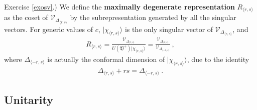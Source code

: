 \documentclass[12pt,a4paper,notitlepage]{report}
\numberwithin{equation}{section}
\theoremstyle{break}
\begin{document}
Exercise \ref{exosv}.) We define the \textbf{\boldmath maximally degenerate representation} $R_{\langle r,s \rangle}$ as the coset of $\mathcal{V}_{\Delta_{\langle r,s \rangle}}$ by the subrepresentation generated by all the singular vectors. 
For generic values of $c$, $|\chi_{\langle r,s \rangle}\rangle$ is the only singular vector of $\mathcal{V}_{\Delta_{\langle r,s \rangle}}$, and 
\begin{align}
 R_{\langle r,s\rangle} =\frac{\mathcal{V}_{\Delta_{\langle r,s \rangle}}}{U(\mathfrak{V}^+) |\chi_{\langle r,s \rangle}\rangle }
= \frac{\mathcal{V}_{\Delta_{\langle r,s \rangle}}}{\mathcal{V}_{\Delta_{\langle -r,s \rangle}} }\ ,
\end{align}
where $\Delta_{\langle -r,s \rangle}$ is actually the conformal dimension of $|\chi_{\langle r,s \rangle}\rangle$, due to the identity
\begin{align}
 \Delta_{\langle r,s \rangle} + rs = \Delta_{\langle -r,s \rangle}\ .
\label{dmr}
\end{align}



\subsection{Unitarity \label{secuni}}
\end{document}
